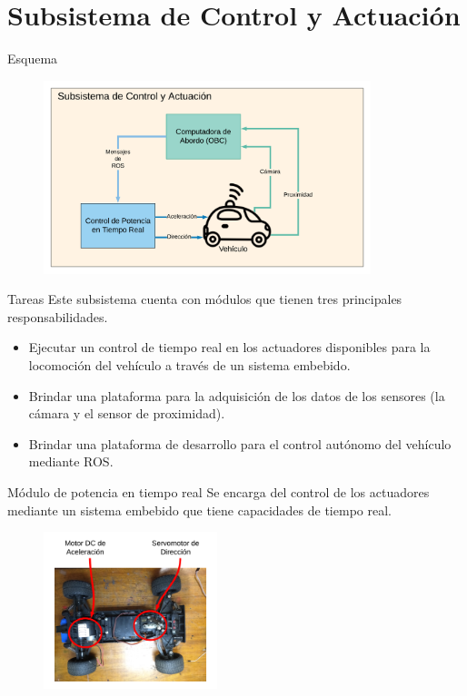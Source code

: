 \documentclass[10pt]{beamer}
\begin{document}
\section{Subsistema de Control y Actuación}
\begin{frame}{Esquema}
    \begin{figure}[!h] 
        \centering
        \includegraphics[width=0.85\textwidth]{../img/control_esq}
        \end{figure}
\end{frame}

\begin{frame}{Tareas}
    Este subsistema cuenta con módulos que tienen tres principales responsabilidades.
    
    \begin{itemize}
        \item Ejecutar un control de tiempo real en los actuadores disponibles para la locomoción del vehículo a través de un sistema embebido.
        \item Brindar una plataforma para la adquisición de los datos de los sensores (la cámara y el sensor de proximidad).
        \item Brindar una plataforma de desarrollo para el control autónomo del vehículo mediante ROS.
    \end{itemize}  
\end{frame}

\begin{frame}{Módulo de potencia en tiempo real}
    Se encarga del control de los actuadores mediante un sistema embebido 
    que tiene capacidades de tiempo real.

    \begin{figure}[!h] 
        \centering
        \includegraphics[width=0.45\textwidth]{../img/actuadores}
        \end{figure}
\end{frame}
\end{document}
